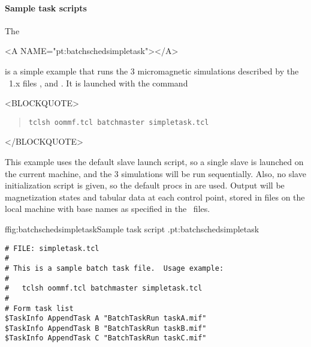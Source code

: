 \paragraph{Sample task scripts}\label{sec:batchschedex}\par
The
\begin{rawhtml}
<A NAME="pt:batchschedsimpletask"></A>
\end{rawhtml}
 is a simple example that runs the
3 micromagnetic simulations described by the \MIF~1.x files
,  and .  It
is launched with the command
\begin{rawhtml}<BLOCKQUOTE>\end{rawhtml}
\begin{quote}
\begin{verbatim}
tclsh oommf.tcl batchmaster simpletask.tcl
\end{verbatim}
\end{quote}
\begin{rawhtml}</BLOCKQUOTE>\end{rawhtml}
This example uses the default slave launch script, so a single slave is
launched on the current machine, and the 3 simulations will be run
sequentially.  Also, no slave initialization script is given, so the
default procs in  are used.  Output will be magnetization
states and tabular data
at each control point, stored in
files on the local machine with base names as specified in the \MIF\
files.

\begin{codelisting}{f}{fig:batchschedsimpletask}{Sample task script
\fn{simpletask.tcl}.}{pt:batchschedsimpletask}
\begin{verbatim}
# FILE: simpletask.tcl
#
# This is a sample batch task file.  Usage example:
#
#   tclsh oommf.tcl batchmaster simpletask.tcl
#
# Form task list
$TaskInfo AppendTask A "BatchTaskRun taskA.mif"
$TaskInfo AppendTask B "BatchTaskRun taskB.mif"
$TaskInfo AppendTask C "BatchTaskRun taskC.mif"
\end{verbatim}
\end{codelisting}

